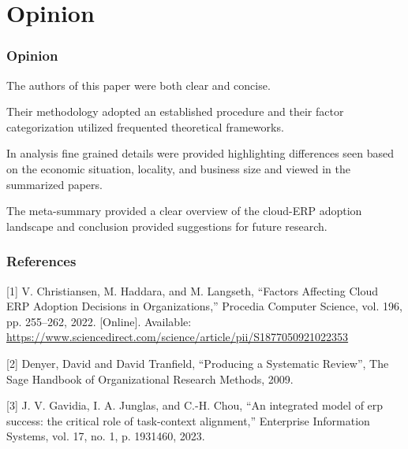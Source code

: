 \documentclass{beamer}
\begin{document}

\section{Opinion}

\begin{frame}

    \frametitle{Opinion}

    The authors of this paper were both clear and concise. \pause

    \vspace{5mm}
    Their methodology adopted an established procedure and their factor categorization utilized frequented theoretical frameworks. \pause

    \vspace{5mm}
    In analysis fine grained details were provided highlighting differences seen based on the economic situation, locality, and business size and viewed in the summarized papers. \pause

    \vspace{5mm}
    The meta-summary provided a clear overview of the cloud-ERP adoption landscape and conclusion provided suggestions for future research.

\end{frame}


\begin{frame}
    \frametitle{References}

    [1] V. Christiansen, M. Haddara, and M. Langseth, “Factors Affecting Cloud ERP Adoption Decisions in  Organizations,” Procedia Computer Science, vol. 196, pp. 255–262, 2022. [Online]. Available: \url{https://www.sciencedirect.com/science/article/pii/S1877050921022353}

    \vspace{2.5mm}
    [2] Denyer, David and David Tranfield, “Producing a Systematic Review”, The Sage Handbook of Organizational Research Methods, 2009.

    \vspace{2.5mm}
    [3] J. V. Gavidia, I. A. Junglas, and C.-H. Chou, “An integrated model of erp success: the critical role of task-context alignment,” Enterprise Information Systems, vol. 17, no. 1, p. 1931460, 2023.

\end{frame}
\end{document}
